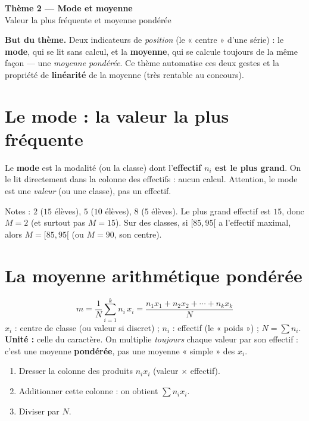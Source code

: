 \documentclass[11pt,a4paper]{article}
\newcommand{\bandeau}[2]{%
\begin{tcolorbox}[boxbase,colback=primary,colframe=primarydark,halign=center,
   before skip=2pt,after skip=12pt]
{\LARGE\bfseries\color{white} #1}\\[3pt]{\normalsize\color{white} #2}
\end{tcolorbox}}
\begin{document}
\bandeau{Thème 2 — Mode et moyenne}{Valeur la plus fréquente et moyenne pondérée}

\noindent\textbf{But du thème.} Deux indicateurs de \emph{position} (le « centre » d'une série) :
le \textbf{mode}, qui se lit sans calcul, et la \textbf{moyenne}, qui se calcule toujours de la même
façon — une \emph{moyenne pondérée}. Ce thème automatise ces deux gestes et la propriété de
\textbf{linéarité} de la moyenne (très rentable au concours).

\section{Le mode : la valeur la plus fréquente}

\begin{definition}[mode $M$]
Le \textbf{mode} est la modalité (ou la classe) dont l'\textbf{effectif $n_i$ est le plus grand}.
On le lit directement dans la colonne des effectifs : aucun calcul. Attention, le mode est une
\emph{valeur} (ou une classe), pas un effectif.
\end{definition}

\begin{exemple}
Notes : $2$ ($15$ élèves), $5$ ($10$ élèves), $8$ ($5$ élèves). Le plus grand effectif est $15$,
donc $M=2$ (et surtout pas $M=15$). Sur des classes, si $[85,95[$ a l'effectif maximal, alors
$M=[85,95[$ (ou $M=90$, son centre).
\end{exemple}

\section{La moyenne arithmétique pondérée}

\begin{formule}
\[
\boxed{\;m=\frac{1}{N}\sum_{i=1}^{k} n_i\,x_i=\frac{n_1x_1+n_2x_2+\cdots+n_kx_k}{N}\;}
\]
$x_i$ : centre de classe (ou valeur si discret) ; $n_i$ : effectif (le « poids ») ; $N=\sum n_i$.
\textbf{Unité :} celle du caractère. On multiplie \emph{toujours} chaque valeur par son effectif :
c'est une moyenne \textbf{pondérée}, pas une moyenne « simple » des $x_i$.
\end{formule}

\begin{methode}
\begin{enumerate}
  \item Dresser la colonne des produits $n_i x_i$ (valeur $\times$ effectif).
  \item Additionner cette colonne : on obtient $\sum n_i x_i$.
  \item Diviser par $N$.
\end{enumerate}
\end{methode}
\end{document}
